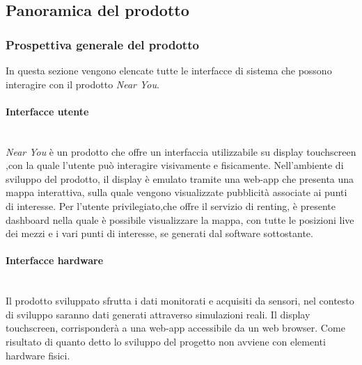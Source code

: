 \documentclass[11pt]{article}
\begin{document}
\begin{justify}
\subsection{Panoramica del prodotto}
\subsubsection{Prospettiva generale del prodotto} 
In questa sezione vengono elencate tutte le interfacce di sistema che possono interagire con il prodotto \textit{Near You}.

\paragraph{Interfacce utente}\mbox{}\\
\textit{Near You} è un prodotto che offre un interfaccia utilizzabile su display touchscreen ,con la quale l'utente può interagire visivamente e fisicamente. Nell'ambiente di sviluppo del prodotto, il display è emulato tramite una web-app che presenta una mappa interattiva, sulla quale vengono visualizzate pubblicità associate ai punti di interesse. Per l'utente privilegiato,che offre il servizio di renting, è presente dashboard nella quale è possibile visualizzare la mappa, con tutte le posizioni live dei mezzi e i vari punti di interesse, se generati dal software sottostante.
\paragraph{Interfacce hardware}\mbox{}\\
Il prodotto sviluppato sfrutta i dati monitorati e acquisiti da sensori, nel contesto di sviluppo saranno dati generati attraverso simulazioni reali. Il display touchscreen, corrisponderà a una web-app accessibile da un web browser. Come risultato di quanto detto lo sviluppo del progetto non avviene con elementi hardware fisici.


\end{justify}
\end{document}
